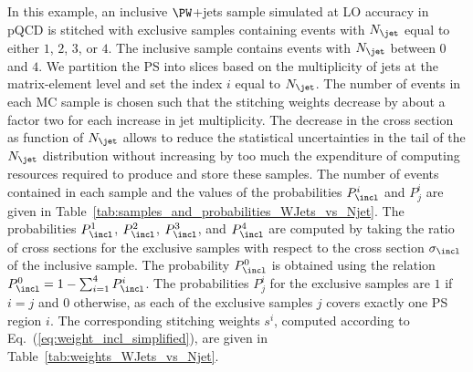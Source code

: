In this example, an inclusive $\PW$+jets sample simulated at LO accuracy in pQCD 
is stitched with exclusive samples containing events with $N_{\jet}$ equal to either $1$, $2$, $3$, or $4$.
The inclusive sample contains events with $N_{\jet}$ between $0$ and $4$.
We partition the PS into slices based on the multiplicity of jets at the matrix-element level and set the index $i$ equal to $N_{\jet}$.
The number of events in each MC sample is chosen such that the stitching weights decrease by about a factor two for each increase in jet multiplicity.
The decrease in the cross section as function of $N_{\jet}$
allows to reduce the statistical uncertainties in the tail of the $N_{\jet}$ distribution
without increasing by too much the expenditure of computing resources required to produce and store these samples.
The number of events contained in each sample and the values of the probabilities $P_{\incl}^{i}$ and $P_{j}^{i}$ are given in Table~\ref{tab:samples_and_probabilities_WJets_vs_Njet}.
The probabilities $P_{\incl}^{1}$, $P_{\incl}^{2}$, $P_{\incl}^{3}$, and $P_{\incl}^{4}$ are computed by taking the ratio of cross sections 
for the exclusive samples with respect to the cross section $\sigma_{\incl}$ of the inclusive sample.
The probability $P_{\incl}^{0}$ is obtained using the relation $P_{\incl}^{0} = 1 - \sum_{i=1}^{4} P_{\incl}^{i}$.
The probabilities $P_{j}^{i}$ for the exclusive samples are $1$ if $i=j$ and $0$ otherwise,
as each of the exclusive samples $j$ covers exactly one PS region $i$.
The corresponding stitching weights $s^{i}$, computed according to Eq.~(\ref{eq:weight_incl_simplified}), are given in Table~\ref{tab:weights_WJets_vs_Njet}.

